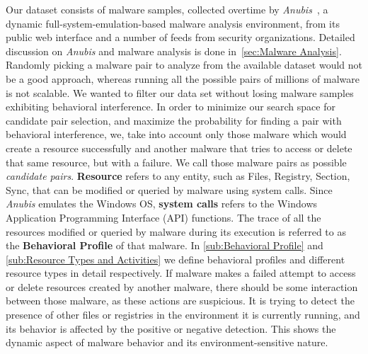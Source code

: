 Our dataset consists of {\gettotalmalwarei{}} malware samples, collected overtime by \emph{Anubis}~\cite[]{anubis}, a dynamic full-system-emulation-based malware analysis environment, from its public web interface and a number of feeds from security organizations.
Detailed discussion on \emph{Anubis} and malware analysis is done in~\autoref{sec:Malware Analysis}.
Randomly picking a malware pair to analyze from the available dataset would not be a good approach, whereas running all the possible pairs of millions of malware is not scalable.
We wanted to filter our data set without losing malware samples exhibiting behavioral interference.
In order to minimize our search space for candidate pair selection, and maximize the probability for finding a pair with behavioral interference, we, take into account only those malware which would create a resource successfully and another malware that tries to access or delete that same resource, but with a failure.
We call those malware pairs as possible \emph{candidate pairs}.
\textbf{Resource} refers to any entity, such as Files, Registry, Section, Sync, that can be modified or queried by malware using system calls.
Since \emph{Anubis} emulates the Windows OS, \textbf{system calls} refers to the Windows Application Programming Interface (API) functions.
The trace of all the resources modified or queried by malware during its execution is referred to as the \textbf{Behavioral Profile} of that malware.
In \autoref{sub:Behavioral Profile} and \autoref{sub:Resource Types and Activities} we define behavioral profiles and different resource types in detail respectively.
If malware makes a failed attempt to access or delete resources created by another malware, there should be some interaction between those malware, as these actions are suspicious.
It is trying to detect the presence of other files or registries in the environment it is currently running, and its behavior is affected by the positive or negative detection.
This shows the dynamic aspect of malware behavior and its environment-sensitive nature.\\

